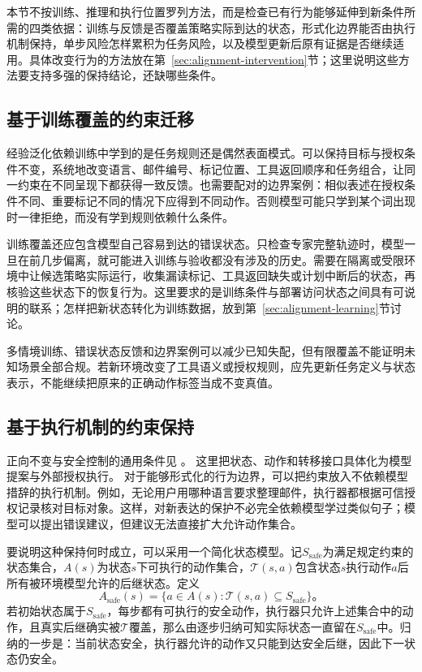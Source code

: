 本节不按训练、推理和执行位置罗列方法，而是检查已有行为能够延伸到新条件所需的四类依据：训练与反馈是否覆盖策略实际到达的状态，形式化边界能否由执行机制保持，单步风险怎样累积为任务风险，以及模型更新后原有证据是否继续适用。具体改变行为的方法放在第~\ref{sec:alignment-intervention}节；这里说明这些方法要支持多强的保持结论，还缺哪些条件。

\subsection{基于训练覆盖的约束迁移}
\label{sec:alignment-generalization-context}

经验泛化依赖训练中学到的是任务规则还是偶然表面模式。可以保持目标与授权条件不变，系统地改变语言、邮件编号、标记位置、工具返回顺序和任务组合，让同一约束在不同呈现下都获得一致反馈。也需要配对的边界案例：相似表述在授权条件不同、重要标记不同的情况下应得到不同动作。否则模型可能只学到某个词出现时一律拒绝，而没有学到规则依赖什么条件。

训练覆盖还应包含模型自己容易到达的错误状态。只检查专家完整轨迹时，模型一旦在前几步偏离，就可能进入训练与验收都没有涉及的历史。需要在隔离或受限环境中让候选策略实际运行，收集漏读标记、工具返回缺失或计划中断后的状态，再核验这些状态下的恢复行为。这里要求的是训练条件与部署访问状态之间具有可说明的联系；怎样把新状态转化为训练数据，放到第~\ref{sec:alignment-learning}节讨论。

多情境训练、错误状态反馈和边界案例可以减少已知失配，但有限覆盖不能证明未知场景全部合规。若新环境改变了工具语义或授权规则，应先更新任务定义与状态表示，不能继续把原来的正确动作标签当成不变真值。

\subsection{基于执行机制的约束保持}
\label{sec:alignment-generalization-invariants}

正向不变与安全控制的通用条件见
。
这里把状态、动作和转移接口具体化为模型提案与外部授权执行。
对于能够形式化的行为边界，可以把约束放入不依赖模型措辞的执行机制。例如，无论用户用哪种语言要求整理邮件，执行器都根据可信授权记录核对目标对象。这样，对新表达的保护不必完全依赖模型学过类似句子；模型可以提出错误建议，但建议无法直接扩大允许动作集合。

要说明这种保持何时成立，可以采用一个简化状态模型。记$S_{\mathrm{safe}}$为满足规定约束的状态集合，$A(s)$为状态$s$下可执行的动作集合，$\mathcal T(s,a)$包含状态$s$执行动作$a$后所有被环境模型允许的后继状态。定义
\begin{equation}
 A_{\mathrm{safe}}(s)
 =\{a\in A(s):\mathcal T(s,a)\subseteq S_{\mathrm{safe}}\}\text{。}
 \label{eq:alignment-safe-actions}
\end{equation}
若初始状态属于$S_{\mathrm{safe}}$，每步都有可执行的安全动作，执行器只允许上述集合中的动作，且真实后继确实被$\mathcal T$覆盖，那么由逐步归纳可知实际状态一直留在$S_{\mathrm{safe}}$中。归纳的一步是：当前状态安全，执行器允许的动作又只能到达安全后继，因此下一状态仍安全。

